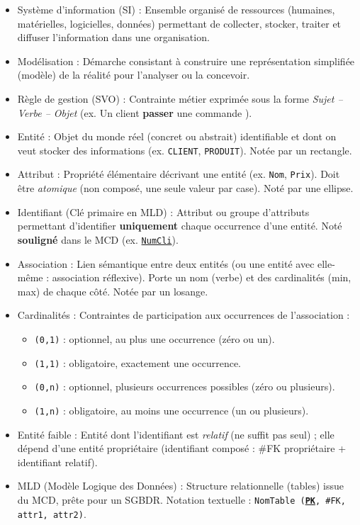 \documentclass[11pt]{article}
\newcommand{\cle}[1]{{\popxbold\color{popdark}#1}}
\begin{document}
\begin{definition}
\begin{itemize}
    \item \cle{Système d'information (SI)} : Ensemble organisé de ressources (humaines, matérielles, logicielles, données) permettant de collecter, stocker, traiter et diffuser l'information dans une organisation.
    \item \cle{Modélisation} : Démarche consistant à construire une représentation simplifiée (modèle) de la réalité pour l'analyser ou la concevoir.
    \item \cle{Règle de gestion (SVO)} : Contrainte métier exprimée sous la forme \emph{Sujet -- Verbe -- Objet} (ex. \og Un client \textbf{passer} une commande \fg).
    \item \cle{Entité} : Objet du monde réel (concret ou abstrait) identifiable et dont on veut stocker des informations (ex. \texttt{CLIENT}, \texttt{PRODUIT}). Notée par un rectangle.
    \item \cle{Attribut} : Propriété élémentaire décrivant une entité (ex. \texttt{Nom}, \texttt{Prix}). Doit être \emph{atomique} (non composé, une seule valeur par case). Noté par une ellipse.
    \item \cle{Identifiant (Clé primaire en MLD)} : Attribut ou groupe d'attributs permettant d'identifier \textbf{uniquement} chaque occurrence d'une entité. Noté \textbf{souligné} dans le MCD (ex. \texttt{\underline{NumCli}}).
    \item \cle{Association} : Lien sémantique entre deux entités (ou une entité avec elle-même : association réflexive). Porte un nom (verbe) et des \cle{cardinalités} (min, max) de chaque côté. Notée par un losange.
    \item \cle{Cardinalités} : Contraintes de participation aux occurrences de l'association :
        \begin{itemize}
            \item \texttt{(0,1)} : optionnel, au plus une occurrence (zéro ou un).
            \item \texttt{(1,1)} : obligatoire, exactement une occurrence.
            \item \texttt{(0,n)} : optionnel, plusieurs occurrences possibles (zéro ou plusieurs).
            \item \texttt{(1,n)} : obligatoire, au moins une occurrence (un ou plusieurs).
        \end{itemize}
    \item \cle{Entité faible} : Entité dont l'identifiant est \emph{relatif} (ne suffit pas seul) ; elle dépend d'une entité propriétaire (identifiant composé : \#FK propriétaire + identifiant relatif).
    \item \cle{MLD (Modèle Logique des Données)} : Structure relationnelle (tables) issue du MCD, prête pour un SGBDR. Notation textuelle : \texttt{NomTable (\textbf{\underline{PK}}, \#FK, attr1, attr2)}.
\end{itemize}
\end{definition}
\end{document}
